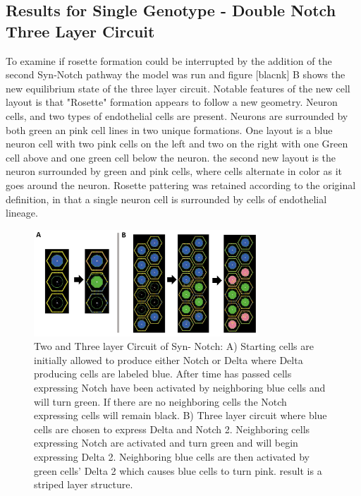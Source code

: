 \subsection{Results for Single Genotype - Double Notch Three Layer Circuit} 

To examine if rosette formation could be interrupted by the addition of the second Syn-Notch pathway the model was run and figure [blacnk] B shows the new equilibrium state of the three layer circuit. Notable features of the new cell layout is that "Rosette" formation appears to follow a new geometry. Neuron cells, and two types of endothelial cells are present. Neurons are surrounded by both green an pink cell lines in two unique formations. One layout is a blue neuron cell with two pink cells on the left and two on the right with one Green cell above and one green cell below the neuron. the second new layout is the neuron surrounded by green and pink cells, where cells alternate in color as it goes around the neuron. Rosette pattering was retained according to the original definition, in that a single neuron cell is surrounded by cells of endothelial lineage. 











\begin{figure}
\begin{center}
\includegraphics[width=8.4cm]{Two_and_Three_layer_Two_Genotype}    %
\caption{Two and Three layer Circuit of Syn- Notch: A) Starting cells are initially allowed to produce either Notch or Delta where Delta producing cells are labeled blue. After time has passed cells expressing Notch have been activated by neighboring blue cells and will turn green. If there are no neighboring cells the Notch expressing cells will remain black. B) Three layer circuit where blue cells are chosen to express Delta and Notch 2. Neighboring cells expressing Notch are activated and turn green and will begin expressing Delta 2. Neighboring blue cells are then activated by green cells' Delta 2 which causes blue cells to turn pink. result is a striped layer structure.  } 
\label{fig:bifurcation}
\end{center}
\end{figure}

